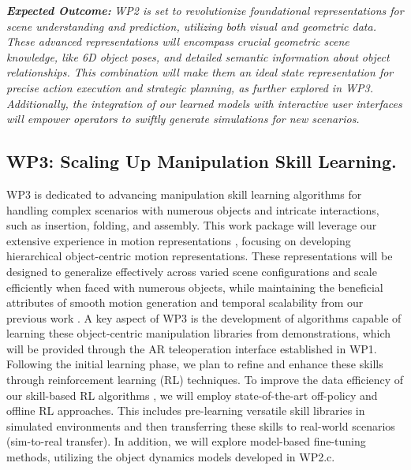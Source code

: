 \documentclass{erc-B2}
\begin{document}
\textbf{\textit{Expected Outcome:}} \textit{WP2 is set to revolutionize foundational representations for scene understanding and prediction, utilizing both visual and geometric data. These advanced representations will encompass crucial geometric scene knowledge, like 6D object poses, and detailed semantic information about object relationships. This combination will make them an ideal state representation for precise action execution and strategic planning, as further explored in WP3. Additionally, the integration of our learned models with interactive user interfaces will empower operators to swiftly generate simulations for new scenarios. }


\subsection{WP3: Scaling Up Manipulation Skill Learning.} 

WP3 is dedicated to advancing manipulation skill learning algorithms for handling complex scenarios with numerous objects and intricate interactions, such as insertion, folding, and assembly. This work package will leverage our extensive experience in motion representations \cite{paraschos2013probabilistic, li2023prodmp, celik2022specializing}, focusing on developing hierarchical object-centric motion representations. These representations will be designed to generalize effectively across varied scene configurations and scale efficiently when faced with numerous objects, while maintaining the beneficial attributes of smooth motion generation and temporal scalability from our previous work \cite{paraschos2013probabilistic, li2023prodmp}.
A key aspect of WP3 is the development of algorithms capable of learning these object-centric manipulation libraries from demonstrations, which will be provided through the AR teleoperation interface established in WP1. Following the initial learning phase, we plan to refine and enhance these skills through reinforcement learning (RL) techniques.
To improve the data efficiency of our skill-based RL algorithms \cite{celik2022specializing, otto2023deep}, we will employ state-of-the-art off-policy and offline RL approaches. This includes pre-learning versatile skill libraries in simulated environments and then transferring these skills to real-world scenarios (sim-to-real transfer). In addition, we will explore model-based fine-tuning methods, utilizing the object dynamics models developed in WP2.c. 
\end{document}
